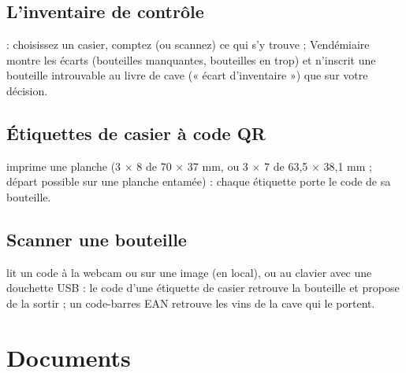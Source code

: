 \documentclass[11pt,a4paper]{article}
\begin{document}
\subsection{L'inventaire de contrôle}
 : choisissez un casier, comptez (ou scannez) ce qui s'y trouve ;
Vendémiaire montre les écarts (bouteilles manquantes, bouteilles en trop) et n'inscrit une bouteille
introuvable au livre de cave (« écart d'inventaire ») que sur votre décision.


\subsection{Étiquettes de casier à code QR}
 imprime une planche (3 × 8 de 70 × 37 mm, ou 3 × 7 de
63,5 × 38,1 mm ; départ possible sur une planche entamée) : chaque étiquette porte le code de sa bouteille.


\subsection{Scanner une bouteille}
 lit un code à la webcam ou sur une image (en local), ou au clavier
avec une douchette USB : le code d'une étiquette de casier retrouve la bouteille et propose de la sortir ;
un code-barres EAN retrouve les vins de la cave qui le portent.


\section{Documents}
\end{document}
